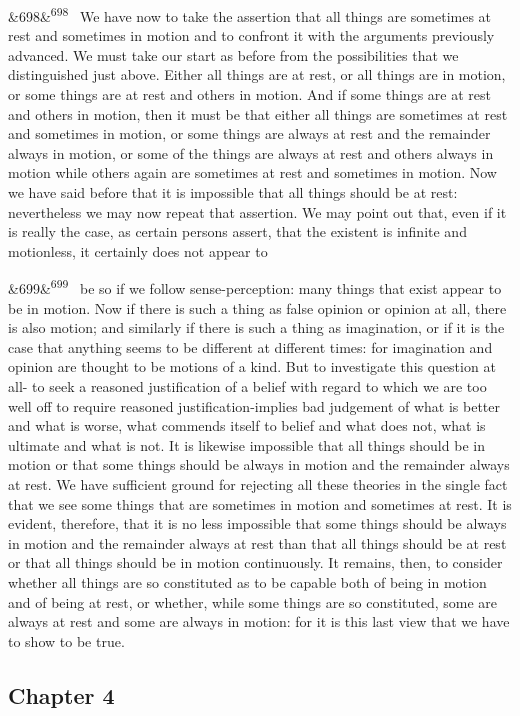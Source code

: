 \documentclass[12pt]{article}
\newcommand{\para}[1][]{\par\noindent\ifx&#1&\else\textsuperscript{\footnotesize #1}~\fi}
\begin{document}
\para[698] We have now to take the assertion that all things are sometimes at rest and sometimes in motion and to confront it with the arguments previously advanced. We must take our start as before from the possibilities that we distinguished just above. Either all things are at rest, or all things are in motion, or some things are at rest and others in motion. And if some things are at rest and others in motion, then it must be that either all things are sometimes at rest and sometimes in motion, or some things are always at rest and the remainder always in motion, or some of the things are always at rest and others always in motion while others again are sometimes at rest and sometimes in motion. Now we have said before that it is impossible that all things should be at rest: nevertheless we may now repeat that assertion. We may point out that, even if it is really the case, as certain persons assert, that the existent is infinite and motionless, it certainly does not appear to

\para[699] be so if we follow sense-perception: many things that exist appear to be in motion. Now if there is such a thing as false opinion or opinion at all, there is also motion; and similarly if there is such a thing as imagination, or if it is the case that anything seems to be different at different times: for imagination and opinion are thought to be motions of a kind. But to investigate this question at all- to seek a reasoned justification of a belief with regard to which we are too well off to require reasoned justification-implies bad judgement of what is better and what is worse, what commends itself to belief and what does not, what is ultimate and what is not. It is likewise impossible that all things should be in motion or that some things should be always in motion and the remainder always at rest. We have sufficient ground for rejecting all these theories in the single fact that we see some things that are sometimes in motion and sometimes at rest. It is evident, therefore, that it is no less impossible that some things should be always in motion and the remainder always at rest than that all things should be at rest or that all things should be in motion continuously. It remains, then, to consider whether all things are so constituted as to be capable both of being in motion and of being at rest, or whether, while some things are so constituted, some are always at rest and some are always in motion: for it is this last view that we have to show to be true.

\subsection*{Chapter 4}
\end{document}
